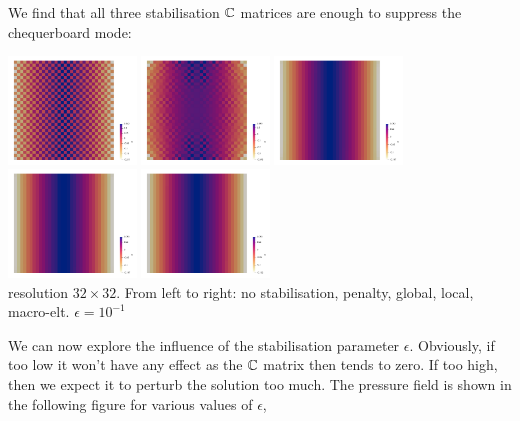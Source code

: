 We find that all three stabilisation ${\mathbb{C}}$ matrices are enough to suppress the chequerboard mode:
\begin{center}
\includegraphics[width=3.4cm]{python_codes/fieldstone_115/results/dh/p0}
\includegraphics[width=3.4cm]{python_codes/fieldstone_115/results/dh/p1}
\includegraphics[width=3.4cm]{python_codes/fieldstone_115/results/dh/p2}
\includegraphics[width=3.4cm]{python_codes/fieldstone_115/results/dh/p3}
\includegraphics[width=3.4cm]{python_codes/fieldstone_115/results/dh/p4}\\
{\captionfont resolution $32\times 32$. From left to right: no stabilisation, penalty, 
global, local, macro-elt. $\epsilon=10^{-1}$}
\end{center}

We can now explore the influence of the stabilisation parameter $\epsilon$. Obviously, 
if too low it won't have any effect as the ${\mathbb{C}}$ matrix then tends to zero. If too high,
then we expect it to perturb the solution too much. 
The pressure field is shown in the following figure for various values of $\epsilon$, 


